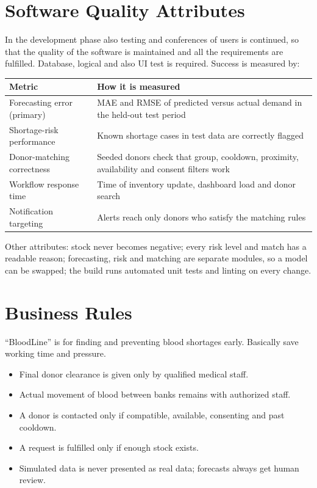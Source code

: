 \documentclass{scrreprt}
\begin{document}
\section{Software Quality Attributes}
In the development phase also testing and conferences of users is continued, so that the quality of the software is maintained and all the requirements are fulfilled. Database, logical and also UI test is required. Success is measured by:
\begin{center}
\small
\begin{tabularx}{\textwidth}{@{}l X@{}}
\toprule
\textbf{Metric} & \textbf{How it is measured}\\
\midrule
Forecasting error (primary) & MAE and RMSE of predicted versus actual demand in the held-out test period\\
Shortage-risk performance & Known shortage cases in test data are correctly flagged\\
Donor-matching correctness & Seeded donors check that group, cooldown, proximity, availability and consent filters work\\
Workflow response time & Time of inventory update, dashboard load and donor search\\
Notification targeting & Alerts reach only donors who satisfy the matching rules\\
\bottomrule
\end{tabularx}
\end{center}
Other attributes: stock never becomes negative; every risk level and match has a readable reason; forecasting, risk and matching are separate modules, so a model can be swapped; the build runs automated unit tests and linting on every change.

\section{Business Rules}
``BloodLine'' is for finding and preventing blood shortages early. Basically save working time and pressure.
\begin{itemize}
    \item Final donor clearance is given only by qualified medical staff.
    \item Actual movement of blood between banks remains with authorized staff.
    \item A donor is contacted only if compatible, available, consenting and past cooldown.
    \item A request is fulfilled only if enough stock exists.
    \item Simulated data is never presented as real data; forecasts always get human review.
\end{itemize}
\end{document}
